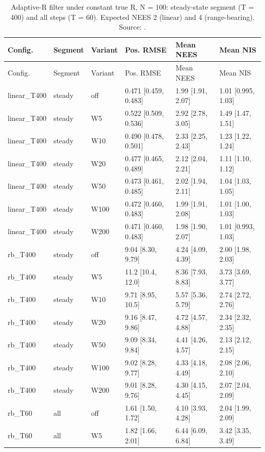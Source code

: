 {\small
\begin{longtable}{llllll}
\caption{Adaptive-R filter under constant true R, N = 100: steady-state segment (T = 400) and all steps (T = 60). Expected NEES 2 (linear) and 4 (range-bearing). Source: .}\label{tab:ar_summary}\\
\toprule
Config. & Segment & Variant & Pos. RMSE & Mean NEES & Mean NIS \\
\midrule
\endfirsthead
\toprule
Config. & Segment & Variant & Pos. RMSE & Mean NEES & Mean NIS \\
\midrule
\endhead
linear\_T400 & steady & off & 0.471 [0.459, 0.483] & 1.99 [1.91, 2.07] & 1.01 [0.995, 1.03] \\
linear\_T400 & steady & W5 & 0.522 [0.509, 0.536] & 2.92 [2.78, 3.05] & 1.49 [1.47, 1.51] \\
linear\_T400 & steady & W10 & 0.490 [0.478, 0.501] & 2.33 [2.25, 2.43] & 1.23 [1.22, 1.24] \\
linear\_T400 & steady & W20 & 0.477 [0.465, 0.489] & 2.12 [2.04, 2.21] & 1.11 [1.10, 1.12] \\
linear\_T400 & steady & W50 & 0.473 [0.461, 0.485] & 2.02 [1.94, 2.11] & 1.04 [1.03, 1.05] \\
linear\_T400 & steady & W100 & 0.472 [0.460, 0.483] & 1.99 [1.91, 2.08] & 1.01 [1.00, 1.03] \\
linear\_T400 & steady & W200 & 0.471 [0.460, 0.483] & 1.98 [1.90, 2.07] & 1.01 [0.993, 1.03] \\
rb\_T400 & steady & off & 9.04 [8.30, 9.79] & 4.24 [4.09, 4.39] & 2.00 [1.98, 2.03] \\
rb\_T400 & steady & W5 & 11.2 [10.4, 12.0] & 8.36 [7.93, 8.83] & 3.73 [3.69, 3.77] \\
rb\_T400 & steady & W10 & 9.71 [8.95, 10.5] & 5.57 [5.36, 5.79] & 2.74 [2.72, 2.76] \\
rb\_T400 & steady & W20 & 9.16 [8.47, 9.86] & 4.72 [4.57, 4.88] & 2.34 [2.32, 2.35] \\
rb\_T400 & steady & W50 & 9.09 [8.34, 9.84] & 4.41 [4.26, 4.57] & 2.13 [2.12, 2.15] \\
rb\_T400 & steady & W100 & 9.02 [8.28, 9.77] & 4.33 [4.18, 4.49] & 2.08 [2.06, 2.10] \\
rb\_T400 & steady & W200 & 9.01 [8.28, 9.76] & 4.30 [4.15, 4.45] & 2.07 [2.04, 2.09] \\
rb\_T60 & all & off & 1.61 [1.50, 1.72] & 4.10 [3.93, 4.28] & 2.04 [1.99, 2.09] \\
rb\_T60 & all & W5 & 1.82 [1.66, 2.01] & 6.44 [6.09, 6.84] & 3.42 [3.35, 3.49] \\

\end{longtable}}
